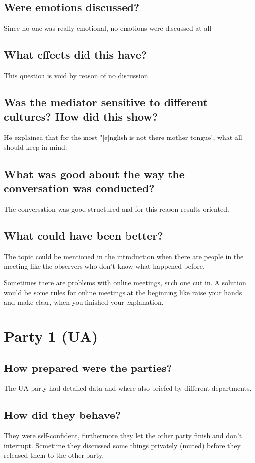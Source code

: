 \documentclass[11pt,fleqn]{book} %
\begin{document}
\subsection{Were emotions discussed?}
Since no one was really emotional, no emotions were discussed at all.

\subsection{What effects did this have?}
This question is void by reason of no discussion.

\subsection{Was the mediator sensitive to different cultures? How did this show?}
He explained that for the most "[e]nglish is not there mother tongue", what all should keep in mind.

\subsection{What was good about the way the conversation was conducted?}
The conversation was good structured and for this reason results-oriented.

\subsection{What could have been better?}
The topic could be mentioned in the introduction when there are people in the meeting like the observers who don't know what happened before.

Sometimes there are problems with online meetings, such one cut in. A solution would be some rules for online meetings at the beginning like raise your hands and make clear, when you finished your explanation.

\section{Party 1 (UA)}
\subsection{How prepared were the parties?}
The UA party had detailed data and where also briefed by different departments.

\subsection{How did they behave?}
They were self-confident, furthermore they let the other party finish and don't interrupt.
Sometime they discussed some things privately (muted) before they released them to the other party.
\end{document}
